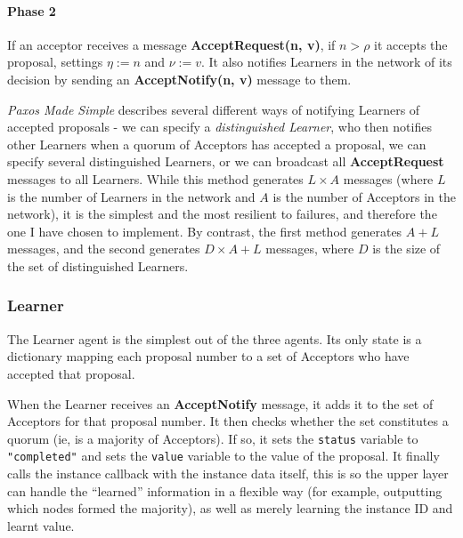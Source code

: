 \documentclass[12pt,twoside,notitlepage]{report}
\newcommand{\msg}[1] {{\bf #1}}         %
\begin{document}
\paragraph{Phase 2}

If an acceptor receives a message \msg{AcceptRequest(n, v)}, if $n > \rho$ it accepts the
proposal, settings $\eta := n$ and $\nu := v$. It also notifies Learners in the network of its
decision by sending an \msg{AcceptNotify(n, v)} message to them.

\emph{Paxos Made Simple} \cite{lamport01} describes several different ways of notifying Learners
of accepted proposals - we can specify a \emph{distinguished Learner}, who then notifies
other Learners when a quorum of Acceptors has accepted a proposal, we can specify several
distinguished Learners, or we can broadcast all \msg{AcceptRequest} messages to all Learners.
While this method generates $L\times A$ messages (where $L$ is the number of Learners in the
network and $A$ is the number of Acceptors in the network), it is the simplest and the most
resilient to failures, and therefore the one I have chosen to implement. By contrast, the first
method generates $A + L$ messages, and the second generates $D\times A + L$ messages, where $D$ is
the size of the set of distinguished Learners.


\subsubsection{Learner}

The Learner agent is the simplest out of the three agents. Its only state is a dictionary mapping
each proposal number to a set of Acceptors who have accepted that proposal.

When the Learner receives an \msg{AcceptNotify} message, it adds it to the set of Acceptors for
that proposal number. It then checks whether the set constitutes a quorum (ie, is a majority of
Acceptors). If so, it sets the \verb+status+ variable to \verb+"completed"+ and sets the
\verb+value+ variable to the value of the proposal. It finally calls the instance callback with
the instance data itself, this is so the upper layer can handle the ``learned'' information in a
flexible way (for example, outputting which nodes formed the majority), as well as merely learning
the instance ID and learnt value.

\end{document}
